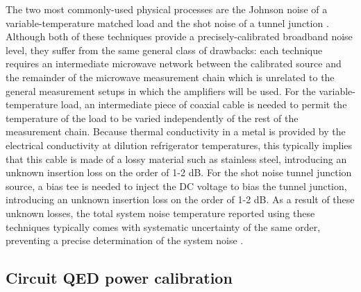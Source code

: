 The two most commonly-used physical processes are the Johnson noise of a variable-temperature matched load \cite{Fernandez1998} and the shot noise of a tunnel junction \cite{Spietz2003}.  Although both of these techniques provide a precisely-calibrated broadband noise level, they suffer from the same general class of drawbacks: each technique requires an intermediate microwave network between the calibrated source and the remainder of the microwave measurement chain which is unrelated to the general measurement setups in which the amplifiers will be used.  For the variable-temperature load, an intermediate piece of coaxial cable is needed to permit the temperature of the load to be varied independently of the rest of the measurement chain.  Because thermal conductivity in a metal is provided by the electrical conductivity at dilution refrigerator temperatures, this typically implies that this cable is made of a lossy material such as stainless steel, introducing an unknown insertion loss on the order of 1-2 dB.  For the shot noise tunnel junction source, a bias tee is needed to inject the DC voltage to bias the tunnel junction, introducing an unknown insertion loss on the order of 1-2 dB.  As a result of these unknown losses, the total system noise temperature reported using these techniques typically comes with systematic uncertainty of the same order, preventing a precise determination of the system noise \cite{Castellanos-Beltran2008,Mutus2014}.

\subsection{Circuit QED power calibration}


